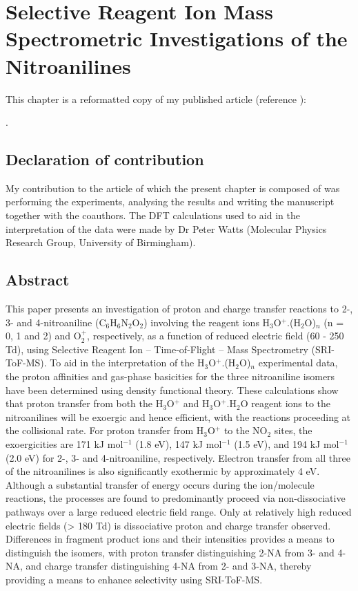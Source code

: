 

\chapter{Selective Reagent Ion Mass Spectrometric Investigations of the Nitroanilines}\label{chapter:nas}


This chapter is a reformatted copy of my published article (reference \cite{nitroanilinespaperreference}):

.








\section*{Declaration of contribution}
My contribution to the article of which the present chapter is composed of was 
performing the experiments, analysing the results and writing the manuscript together with the coauthors. 
The DFT calculations used to aid in the interpretation of the data were made by Dr Peter Watts (Molecular Physics Research Group, University of Birmingham).








\section{Abstract}
This paper presents an investigation of proton and charge transfer reactions to 2-, 3- and 4-nitroaniline (C$_6$H$_6$N$_2$O$_2$) involving the reagent ions H$_3$O$^+$.(H$_2$O)$_n$ (n = 0, 1 and 2) and O$_2^+$, respectively, as a function of reduced electric field (60 - 250 Td), using Selective Reagent Ion – Time-of-Flight – Mass Spectrometry (SRI-ToF-MS). To aid in the interpretation of the H$_3$O$^+$.(H$_2$O)$_n$ experimental data, the proton affinities and gas-phase basicities for the three nitroaniline isomers have been determined using density functional theory. These calculations show that proton transfer from both the H$_3$O$^+$ and H$_3$O$^+$.H$_2$O reagent ions to the nitroanilines will be exoergic and hence efficient, with the reactions proceeding at the collisional rate. For proton transfer from H$_3$O$^+$ to the NO$_2$ sites, the exoergicities are 171 kJ mol$^{-1}$ (1.8 eV), 147 kJ mol$^{-1}$ (1.5 eV), and 194 kJ mol$^{-1}$ (2.0 eV) for 2-, 3- and 4-nitroaniline, respectively. Electron transfer from all three of the nitroanilines is also significantly exothermic by approximately 4 eV. Although a substantial transfer of energy occurs during the ion/molecule reactions, the processes are found to predominantly proceed via non-dissociative pathways over a large reduced electric field range. Only at relatively high reduced electric fields (> 180 Td) is dissociative proton and charge transfer observed. Differences in fragment product ions and their intensities provides a means to distinguish the isomers, with proton transfer distinguishing 2-NA from 3- and 4-NA, and charge transfer distinguishing 4-NA from 2- and 3-NA, thereby providing a means to enhance selectivity using SRI-ToF-MS.


